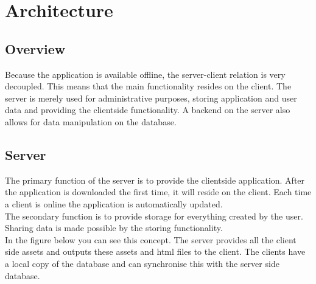 \documentclass{report}
\begin{document}
	\section{Architecture}
	
			\subsection{Overview}
				Because the application is available offline, the server-client relation is very decoupled. This means that the main functionality resides on the client. The server is merely used for administrative purposes, storing application and user data and providing the clientside functionality. A backend on the server also allows for data manipulation on the database.
				
			\subsection{Server}
				The primary function of the server is to provide the clientside application. After the application is downloaded the first time, it will reside on the client. Each time a client is online the application is automatically updated. \\
				The secondary function is to provide storage for everything created by the user. Sharing data is made possible by the storing functionality. \\
				In the figure below you can see this concept. The server provides all the client side assets and outputs these assets and html files to the client. The clients have a local copy of the database and can synchronise this with the server side database.
				\clearpage
\end{document}
